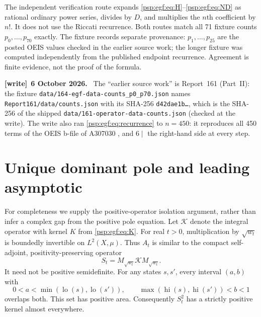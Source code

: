 \documentclass[11pt,letterpaper]{article}
\numberwithin{equation}{section}
\theoremstyle{remark}\newtheorem{remark}[theorem]{Remark}
\newcommand{\lo}{\operatorname{lo}}
\newcommand{\hi}{\operatorname{hi}}
\newcommand{\file}[1]{\nolinkurl{#1}}
\newenvironment{writenote}[1][]{\par\smallskip\begingroup\small
 \noindent\textbf{[write]}\if\relax\detokenize{#1}\relax\else~\textbf{#1.}\fi\ }%
 {\par\endgroup\smallskip}
\begin{document}
The independent verification route expands \eqref{psp:egf:eq:H}--\eqref{psp:egf:eq:ND}
as rational ordinary power series, divides by $D$, and multiplies the
$n$th coefficient by $n!$. It does not use the Riccati recurrence.
Both routes match all 71 fixture counts $p_0,\ldots,p_{70}$ exactly.
The fixture records separate provenance: $p_1,\ldots,p_{25}$ are the
posted OEIS values checked in the earlier source work; the longer
fixture was computed independently from the published endpoint
recurrence. Agreement is finite evidence, not the proof of the formula.
\begin{writenote}[6 October 2026]
The ``earlier source work'' is Report~161 (Part~II): the fixture \file{data/164-egf-data-counts_p0_p70.json} names \file{Report161/data/counts.json} with its SHA-256 \texttt{d42dae1b\ldots}, which is the SHA-256 of the shipped \file{data/161-operator-data-counts.json} (checked at the write). The write also ran \eqref{psp:egf:eq:recurrence} to $n=450$: it reproduces all 450 terms of the OEIS b-file of A307030 \cite{oeisA307030}, and $6\mid$ the right-hand side at every step.
\end{writenote}

\section{Unique dominant pole and leading asymptotic}\label{psp:egf:sec:dominance}
For completeness we supply the positive-operator isolation argument,
rather than infer a complex gap from the positive pole equation.
Let $\mathcal K$ denote the integral operator with kernel $K$ from
\eqref{psp:egf:eq:K}. For real $t>0$, multiplication by $\sqrt{w_t}$ is boundedly
invertible on $L^2(X,\mu)$. Thus $A_t$ is similar to the compact
self-adjoint, positivity-preserving operator
\[
 S_t=M_{\sqrt{w_t}}\mathcal K M_{\sqrt{w_t}}.
\]
It need not be positive semidefinite. For any states $s,s'$, every
interval $(a,b)$ with
\[
 0<a<\min(\lo(s),\lo(s')),
 \qquad \max(\hi(s),\hi(s'))<b<1
\]
overlaps both. This set has positive area. Consequently $S_t^2$ has a
strictly positive kernel almost everywhere.
\end{document}

